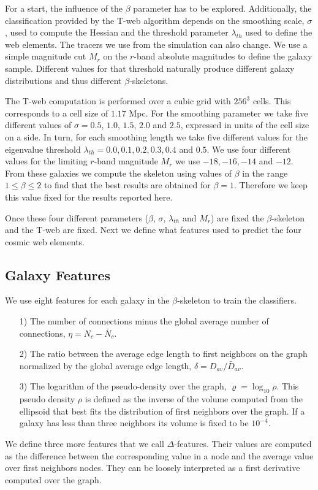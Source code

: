 \documentclass[usenatbib]{mnras}
\begin{document}
For a start, the influence of the $\beta$ parameter has to be explored.
Additionally, the classification provided by the T-web algorithm
depends on the smoothing scale, $\sigma$, used to compute the Hessian and the
threshold parameter $\lambda_{th}$ used to define the web elements.
The tracers we use from the simulation can also change. 
We use a simple magnitude cut $M_{r}$ on the $r$-band absolute magnitudes
to define the galaxy sample. 
Different values for that threshold naturally produce different galaxy
distributions and thus different $\beta$-skeletons. 

The T-web computation is performed over a cubic grid with $256^3$
cells. 
This corresponds to a cell size of $1.17$ Mpc.
For the smoothing parameter we take five different values of $\sigma =
0.5$, $1.0$, $1.5$, $2.0$ and $2.5$, expressed in units of the cell
size on a side.   
In turn, for each smoothing length we take five different values for
the eigenvalue threshold
$\lambda_{th}=0.0, 0.1, 0.2, 0.3, 0.4$ and $0.5$. 
We use four different values for the limiting $r$-band magnitude
$M_{r}$ we use  $-18, -16, -14$ and $-12$.
From these galaxies we compute the skeleton using values of $\beta$ in
the range $1\leq \beta \leq 2$ to find that the best results are
obtained for $\beta=1$.   
Therefore we keep this value fixed for the results reported here.

Once these four different parameters ($\beta$,
$\sigma$, $\lambda_{th}$ and $M_{r}$) are fixed the $\beta$-skeleton and the
T-web are fixed.  
Next we define what features used to predict the four cosmic web elements.

\subsection{Galaxy Features}
We use eight features for each galaxy in the $\beta$-skeleton to train the classifiers. 

\begin{enumerate}
\item[1)]
The number of connections minus the global average number of
connections, $\eta = N_c - \bar{N}_c$. 
\item[2)]
The ratio between the average edge length to first neighbors on the graph
normalized by the global average edge length, $\delta=D_{av}/\bar{D}_{av}$. 
\item[3)] 
The logarithm of the pseudo-density over the graph,
  $\varrho=\log_{10}\rho$.   
This pseudo density $\rho$ is defined as the inverse of the volume
computed from the ellipsoid that best fits the distribution of first
neighbors over the graph. 
If a galaxy has less than three neighbors its volume is fixed to be $10^{-4}$.
\end{enumerate}
\noindent
We define three more features that we call $\Delta$-features.
Their values are computed as the difference between the corresponding
value in a node and the average value over first neighbors nodes.  
They can be loosely interpreted as a first derivative computed over the graph. 
\end{document}
